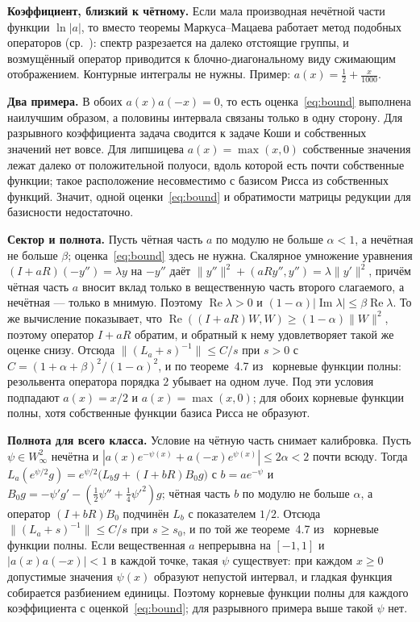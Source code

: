 \documentclass[12pt,a4paper]{article}
\begin{document}
\textbf{Коэффициент, близкий к чётному.} Если мала производная нечётной части функции
$\ln|a|$, то вместо теоремы Маркуса--Мацаева работает метод подобных операторов
(ср.~\cite{S5}): спектр разрезается на далеко отстоящие группы, и возмущённый оператор
приводится к блочно-диагональному виду сжимающим отображением. Контурные интегралы не
нужны. Пример: $a(x)=\tfrac12+\tfrac x{1000}$.

\textbf{Два примера.} В обоих $a(x)a(-x)=0$, то есть оценка~\eqref{eq:bound} выполнена
наилучшим образом, а половины интервала связаны только в одну сторону. Для разрывного
коэффициента задача сводится к задаче Коши и собственных значений нет вовсе. Для
липшицева $a(x)=\max(x,0)$ собственные значения лежат далеко от положительной полуоси,
вдоль которой есть почти собственные функции; такое расположение несовместимо с базисом
Рисса из собственных функций. Значит, одной оценки~\eqref{eq:bound} и обратимости
матрицы редукции для базисности недостаточно.

\textbf{Сектор и полнота.} Пусть чётная часть $a$ по модулю не больше $\alpha<1$, а
нечётная не больше $\beta$; оценка~\eqref{eq:bound} здесь не нужна. Скалярное умножение
уравнения $(I+aR)(-y'')=\lambda y$ на $-y''$ даёт
$\|y''\|^2+(aRy'',y'')=\lambda\|y'\|^2$, причём чётная часть $a$ вносит вклад только в
вещественную часть второго слагаемого, а нечётная --- только в мнимую. Поэтому
$\operatorname{Re}\lambda>0$ и $(1-\alpha)|\operatorname{Im}\lambda|\le\beta\operatorname{Re}\lambda$.
То же вычисление показывает, что $\operatorname{Re}((I+aR)W,W)\ge(1-\alpha)\|W\|^2$,
поэтому оператор $I+aR$ обратим, и обратный к нему удовлетворяет такой же оценке снизу.
Отсюда $\|(L_a+s)^{-1}\|\le C/s$ при $s>0$ с $C=(1+\alpha+\beta)^2/(1-\alpha)^2$, и по
теореме~4.7 из~\cite{S3} корневые функции полны: резольвента оператора порядка $2$
убывает на одном луче. Под эти условия подпадают $a(x)=x/2$ и $a(x)=\max(x,0)$; для
обоих корневые функции полны, хотя собственные функции базиса Рисса не образуют.

\textbf{Полнота для всего класса.} Условие на чётную часть снимает калибровка. Пусть
$\psi\in W^2_\infty$ нечётна и $|a(x)e^{-\psi(x)}+a(-x)e^{\psi(x)}|\le2\alpha<2$ почти
всюду. Тогда $L_a(e^{\psi/2}g)=e^{\psi/2}\bigl(L_bg+(I+bR)B_0g\bigr)$ с $b=ae^{-\psi}$ и
$B_0g=-\psi'g'-(\tfrac12\psi''+\tfrac14\psi'^2)g$; чётная часть $b$ по модулю не больше
$\alpha$, а оператор $(I+bR)B_0$ подчинён $L_b$ с показателем $1/2$. Отсюда
$\|(L_a+s)^{-1}\|\le C/s$ при $s\ge s_0$, и по той же теореме~4.7 из~\cite{S3} корневые
функции полны. Если вещественная $a$ непрерывна на $[-1,1]$ и $|a(x)a(-x)|<1$ в каждой
точке, такая $\psi$ существует: при каждом $x\ge0$ допустимые значения $\psi(x)$ образуют
непустой интервал, и гладкая функция собирается разбиением единицы. Поэтому корневые
функции полны для каждого коэффициента с оценкой~\eqref{eq:bound}; для разрывного
примера выше такой $\psi$ нет.
\end{document}

